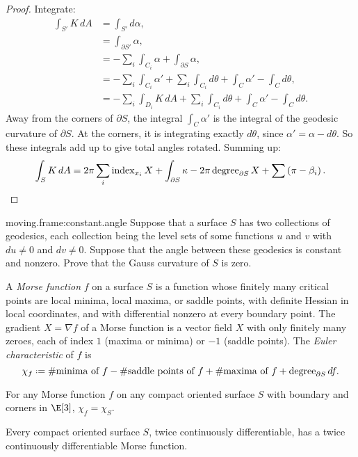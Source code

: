 \begin{proof}
Integrate:
\begin{align*}
\int_{S'} K \, dA 
&=
\int_{S'} d\alpha,
\\
&=
\int_{\partial S'} \alpha,
\\
&=
-\sum_i \int_{C_i} \alpha
+\int_{\partial S} \alpha,
\\
&=
-\sum_i \int_{C_i} \alpha' + \sum_i \int_{C_i} d\theta
+\int_C \alpha' - \int_C d\theta,
\\
&=
-\sum_i \int_{D_i} K \, dA + \sum_i \int_{C_i} d\theta
+\int_C \alpha' - \int_C d\theta.
\end{align*}
Away from the corners of \(\partial S\), the integral \(\int_C \alpha'\) is the integral of the geodesic curvature of \(\partial S\).
At the corners, it is integrating exactly \(d\theta\), since \(\alpha'=\alpha-d\theta\).
So these integrals add up to give total angles rotated.
Summing up:
\[
\int_S K \, dA
=
2 \pi \sum_i \operatorname{index}_{x_i} X
 + \int_{\partial S} \kappa - 2 \pi \operatorname{degree}_{\partial S} X 
 + \sum \left(\pi-\beta_i\right).
\]
\end{proof}
\begin{problem}{moving.frame:constant.angle}
Suppose that a surface \(S\) has two collections of geodesics, each collection being the level sets of some functions \(u\) and \(v\) with \(du \ne 0\) and \(dv \ne 0\).
Suppose that the angle between these geodesics is constant and nonzero.
Prove that the Gauss curvature of \(S\) is zero.
\end{problem}
A \emph{Morse function} \(f\) on a surface \(S\) is a function whose finitely many critical points are local minima, local maxima, or saddle points, with definite Hessian in local coordinates, and with differential nonzero at every boundary point.
The gradient \(X=\nabla f\) of a Morse function is a vector field \(X\) with only finitely many zeroes, each of index \(1\) (maxima or minima) or \(-1\) (saddle points).
The \emph{Euler characteristic} of \(f\) is
\[
\chi_f\defeq
\#{\text{minima of }f}
-\#{\text{saddle points of }f}
+\#{\text{maxima of }f} 
+ \operatorname{degree}_{\partial S} df.
\]
\begin{corollary}
For any Morse function \(f\) on any compact oriented surface \(S\) with boundary and corners in \(\E[3]\), \(\chi_f=\chi_S\).
\end{corollary}
\begin{theorem}\label{theorem:exists.decent.vf.corner}
Every compact oriented surface \(S\), twice continuously differentiable, has a twice continuously differentiable Morse function.
\end{theorem}
